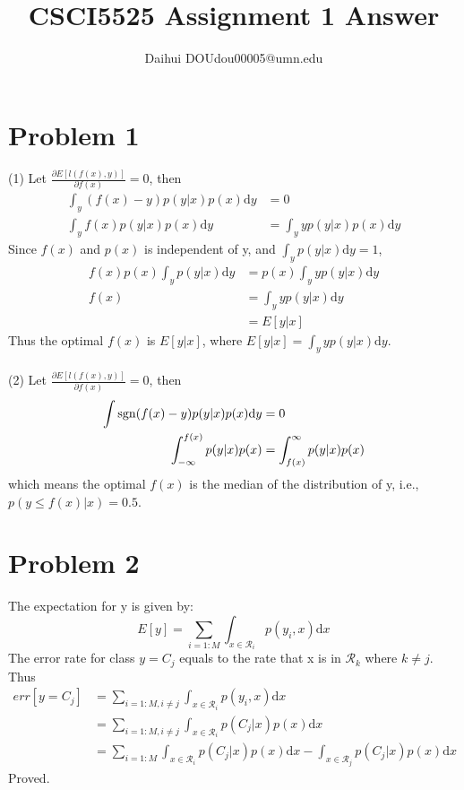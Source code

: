 \documentclass[a4paper]{article}
\title{CSCI5525 Assignment 1 Answer}
\author{Daihui DOU\qquad dou00005@umn.edu\qquad 5514178 }
\begin{document}
\maketitle

\section{Problem 1}
(1) Let $\frac{\partial E[l(f(x),y)]}{\partial f(x)} = 0$, then
\begin{align*}
    \int_{y}(f(x)-y)p(y|x)p(x)\mathrm{d}y &=0 \\
    \int_{y}f(x)p(y|x)p(x)\mathrm{d}y &= \int_{y}yp(y|x)p(x)\mathrm{d}y
\end{align*}
Since $f(x)$ and $p(x)$ is independent of y, and $\int_{y}p(y|x)\mathrm{d}y = 1$,
\begin{align*}
    f(x)p(x)\int_{y}p(y|x)\mathrm{d}y &=  p(x)\int_{y}yp(y|x)\mathrm{d}y\\
    f(x) &= \int_{y}yp(y|x)\mathrm{d}y\\
     &= E[y|x]
\end{align*}
Thus the optimal $f(x)$ is $E[y|x]$, where $E[y|x]=\int_{y}yp(y|x)\mathrm{d}y.$\\
\\
(2) Let $\frac{\partial E[l(f(x),y)]}{\partial f(x)} = 0$, then
\begin{align*}
    \int \mathop{\rm sgn}(f(x)-y) p(y|x)p(x)\mathrm{d}y &= 0\\
    \int_{-\infty}^{f(x)} p(y|x)p(x) &= \int_{f(x)}^{\infty} p(y|x)p(x)
\end{align*}
which means the optimal $f(x)$ is the median of the distribution of y, i.e., $p(y\leq f(x)|x) = 0.5$.

\section{Problem 2}
The expectation for y is given by:
$$E[y]=\sum_{i=1:M}\int_{x\in \mathcal{R}_{i}}p(y_{i},x)\mathrm{d}x $$
The error rate for class $y=C_{j}$ equals to the rate that x is in $\mathcal{R}_{k}$ where $k\neq j$. Thus
\begin{align*}
    err[y=C_{j}]&=\sum_{i=1:M,i\neq j}\int_{x\in \mathcal{R}_{i}}p(y_{i},x)\mathrm{d}x \\
            &=\sum_{i=1:M,i\neq j}\int_{x\in \mathcal{R}_{i}}p(C_{j}|x)p(x)\mathrm{d}x \\
            &=\sum_{i=1:M}\int_{x\in \mathcal{R}_{i}}p(C_{j}|x)p(x)\mathrm{d}x-\int_{x\in \mathcal{R}_{j}}p(C_{j}|x)p(x)\mathrm{d}x
\end{align*}
Proved.
\end{document}
